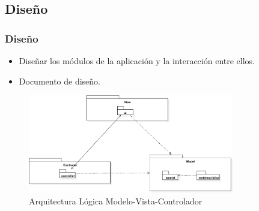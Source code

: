 \documentclass[9pt]{beamer}
\begin{document}
    \subsection{Diseño}
    \begin{frame}
        \frametitle{Diseño}                 
               
        \begin{itemize}
            \item Diseñar los módulos de la aplicación y la interacción entre ellos.
            \item Documento de diseño.
        \end{itemize}

        \begin{figure}
            \includegraphics[width=0.8\textwidth]{assets/ArquitecturaLogica.eps}
            \caption{Arquitectura Lógica Modelo-Vista-Controlador}
        \end{figure}

    \end{frame}


\end{document}
